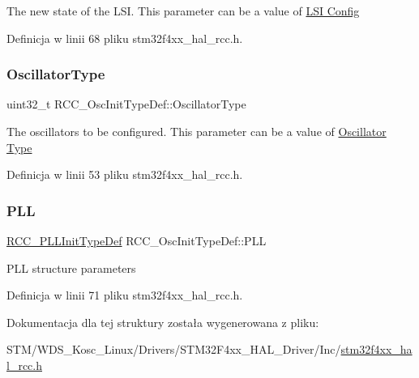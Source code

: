 The new state of the L\+SI. This parameter can be a value of \hyperlink{group___r_c_c___l_s_i___config}{L\+SI Config} 

Definicja w linii 68 pliku stm32f4xx\+\_\+hal\+\_\+rcc.\+h.

\mbox{\label{struct_r_c_c___osc_init_type_def_af9e7bc89cab81c1705d94c74c7a81088}} 
\subsubsection{\texorpdfstring{Oscillator\+Type}{OscillatorType}}
{\footnotesize\ttfamily uint32\+\_\+t R\+C\+C\+\_\+\+Osc\+Init\+Type\+Def\+::\+Oscillator\+Type}

The oscillators to be configured. This parameter can be a value of \hyperlink{group___r_c_c___oscillator___type}{Oscillator Type} 

Definicja w linii 53 pliku stm32f4xx\+\_\+hal\+\_\+rcc.\+h.

\mbox{\label{struct_r_c_c___osc_init_type_def_af76de5ee86798f0c3a4c83c84dfa58be}} 
\subsubsection{\texorpdfstring{P\+LL}{PLL}}
{\footnotesize\ttfamily \hyperlink{struct_r_c_c___p_l_l_init_type_def}{R\+C\+C\+\_\+\+P\+L\+L\+Init\+Type\+Def} R\+C\+C\+\_\+\+Osc\+Init\+Type\+Def\+::\+P\+LL}

P\+LL structure parameters 

Definicja w linii 71 pliku stm32f4xx\+\_\+hal\+\_\+rcc.\+h.



Dokumentacja dla tej struktury została wygenerowana z pliku\+:\begin{DoxyCompactItemize}
\item 
S\+T\+M/\+W\+D\+S\+\_\+\+Kosc\+\_\+\+Linux/\+Drivers/\+S\+T\+M32\+F4xx\+\_\+\+H\+A\+L\+\_\+\+Driver/\+Inc/\hyperlink{stm32f4xx__hal__rcc_8h}{stm32f4xx\+\_\+hal\+\_\+rcc.\+h}\end{DoxyCompactItemize}

